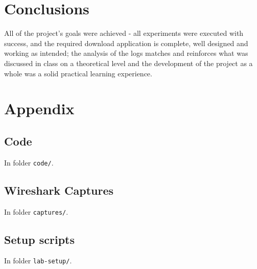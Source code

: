 \section{Conclusions}

All of the project's goals were achieved - all experiments were executed with success, and the required download application is complete, well designed and working as intended; the analysis of the logs matches and reinforces what was discussed in class on a theoretical level and the development of the project as a whole was a solid practical learning experience.

\onecolumn
\appendix
\section{Appendix}

\subsection{Code}

\noindent In folder \lstinline{code/}.

\subsection{Wireshark Captures}

\noindent In folder \lstinline{captures/}.

\subsection{Setup scripts}

\noindent In folder \lstinline{lab-setup/}.